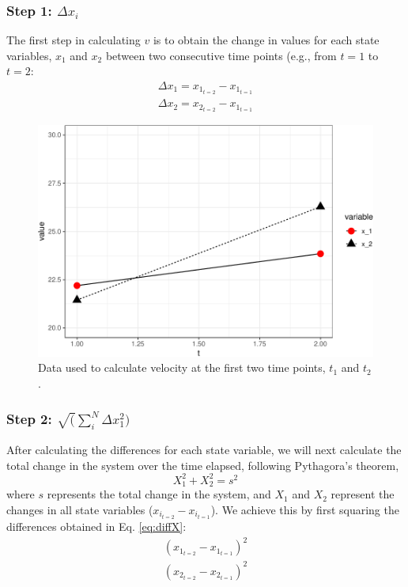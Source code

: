 \documentclass[12pt,twoside,openany]{reedthesis}
\begin{document}
\subsubsection{\texorpdfstring{Step 1:
\(\Delta x_i\)}{Step 1: \textbackslash{}Delta x\_i}}\label{step-1-delta-x_i}

The first step in calculating \(v\) is to obtain the change in values
for each state variables, \(x_1\) and \(x_2\) between two consecutive
time points (e.g., from \(t=1\) to \(t=2\):
\begin{equation}
\begin{array}{rcr}
\Delta x_1 = x_{1_{t=2}} - x_{1_{t=1}} \\
\Delta x_2 = x_{2_{t=2}} - x_{1_{t=1}}
  \end{array}
\label{eq:diffX}
\end{equation}
\begin{figure}
\centering
\includegraphics{_myDissertation_files/figure-latex/sysEx2-1.pdf}
\caption{\label{fig:sysEx2}Data used to calculate velocity at the first two
time points, \(t_1\) and \(t_2\).}
\end{figure}
\subsubsection{\texorpdfstring{Step 2:
\(\sqrt(\sum_i^N\Delta x_1^2)\)}{Step 2: \textbackslash{}sqrt(\textbackslash{}sum\_i\^{}N\textbackslash{}Delta x\_1\^{}2)}}\label{step-2-sqrtsum_indelta-x_12}

After calculating the differences for each state variable, we will next
calculate the total change in the system over the time elapsed,
following Pythagora's theorem,
\begin{equation}
 X_1^2 + X_2^2 = s^2 
  \label{eq:pythagorean}
\end{equation}
where \(s\) represents the total change in the system, and \(X_1\) and
\(X_2\) represent the changes in all state variables
(\(x_{i_{t=2}} - x_{i_{t=1}}\)). We achieve this by first squaring the
differences obtained in Eq. \eqref{eq:diffX}:
\begin{equation}
\begin{array}{rcr}
(x_{1_{t=2}} - x_{1_{t=1}})^2  \\
(x_{2_{t=2}} - x_{2_{t=1}})^2 
\end{array}
  \label{eq:diffXsq}
\end{equation}
\end{document}
